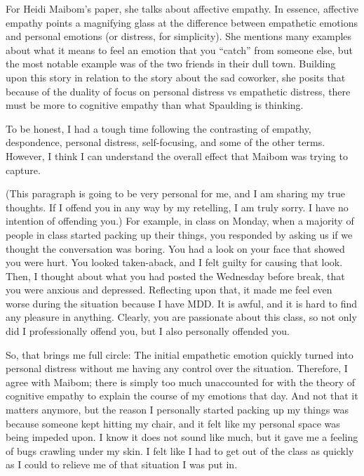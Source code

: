 \documentclass[11pt]{article}
\begin{document}
For Heidi Maibom's paper, she talks about affective empathy. In essence, affective empathy points a magnifying glass at the difference between empathetic emotions and personal emotions (or distress, for simplicity). She mentions many examples about what it means to feel an emotion that you ``catch'' from someone else, but the most notable example was of the two friends in their dull town. Building upon this story in relation to the story about the sad coworker, she posits that because of the duality of focus on personal distress vs empathetic distress, there must be more to cognitive empathy than what Spaulding is thinking. 

To be honest, I had a tough time following the contrasting of empathy, despondence, personal distress, self-focusing, and some of the other terms. However, I think I can understand the overall effect that Maibom was trying to capture. 

(This paragraph is going to be very personal for me, and I am sharing my true thoughts. If I offend you in any way by my retelling, I am truly sorry. I have no intention of offending you.) For example, in class on Monday, when a majority of people in class started packing up their things, you responded by asking us if we thought the conversation was boring. You had a look on your face that showed you were hurt. You looked taken-aback, and I felt guilty for causing that look. Then, I thought about what you had posted the Wednesday before break, that you were anxious and depressed. Reflecting upon that, it made me feel even worse during the situation because I have MDD. It is awful, and it is hard to find any pleasure in anything. Clearly, you are passionate about this class, so not only did I professionally offend you, but I also personally offended you. 

So, that brings me full circle: The initial empathetic emotion quickly turned into personal distress without me having any control over the situation. Therefore, I agree with Maibom; there is simply too much unaccounted for with the theory of cognitive empathy to explain the course of my emotions that day. And not that it matters anymore, but the reason I personally started packing up my things was because someone kept hitting my chair, and it felt like my personal space was being impeded upon. I know it does not sound like much, but it gave me a feeling of bugs crawling under my skin. I felt like I had to get out of the class as quickly as I could to relieve me of that situation I was put in. 
\end{document}
